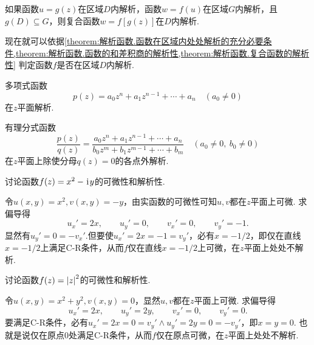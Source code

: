 \begin{theorem}\label{theorem:解析函数.复合函数的解析性}
如果函数\(u=g(z)\)在区域\(D\)内解析，函数\(w=f(u)\)在区域\(G\)内解析，且\(g(D) \subseteq G\)，则复合函数\(w=f[g(z)]\)在\(D\)内解析.
\end{theorem}

现在就可以依据\cref{theorem:解析函数.函数在区域内处处解析的充分必要条件,theorem:解析函数.函数的和差积商的解析性,theorem:解析函数.复合函数的解析性} 判定函数\(f\)是否在区域\(D\)内解析.

\begin{example}
多项式函数\begin{equation*}
p(z) = a_0 z^n + a_1 z^{n-1} + \dotsb + a_n \quad (a_0 \neq 0)
\end{equation*}在\(z\)平面解析.
\end{example}

\begin{example}
有理分式函数\begin{equation*}
\frac{p(z)}{q(z)} = \frac{a_0 z^n + a_1 z^{n-1} + \dotsb + a_n}{b_0 z^m + b_1 z^{m-1} + \dotsb + b_m} \quad (a_0 \neq 0,\ b_0 \neq 0)
\end{equation*}在\(z\)平面上除使分母\(q(z)=0\)的各点外解析.
\end{example}

\begin{example}
讨论函数\(f(z) = x^2 - \kern1pt\mathrm{i}\kern1pt y\)的可微性和解析性.
\begin{solution}
令\(u(x,y) = x^2, v(x,y) = -y\)，由实函数的可微性可知\(u,v\)都在\(z\)平面上可微.
求偏导得\begin{equation*}
u_x' = 2x, \qquad u_y' = 0, \qquad v_x' = 0, \qquad v_y' = -1.
\end{equation*}显然有\(u_y' = 0 = -v_x'\).但要使\(u_x' = 2x = -1 = v_y'\)，必有\(x = -1/2\)，即仅在直线\(x=-1/2\)上满足C-R条件，从而\(f\)仅在直线\(x=-1/2\)上可微，在\(z\)平面上处处不解析.
\end{solution}
\end{example}

\begin{example}
讨论函数\(f(z) = \abs{z}^2\)的可微性和解析性.
\begin{solution}
令\(u(x,y) = x^2 + y^2, v(x,y) = 0\)，显然\(u,v\)都在\(z\)平面上可微.
求偏导得\begin{equation*}
u_x' = 2x, \qquad u_y' = 2y, \qquad v_x' = 0, \qquad v_y' = 0.
\end{equation*}要满足C-R条件，必有\(u_x' = 2x = 0 = v_y' \land u_y' = 2y = 0 = -v_y'\)，即\(x=y=0\).
也就是说仅在原点0处满足C-R条件，从而\(f\)仅在原点可微，在\(z\)平面上处处不解析.
\end{solution}
\end{example}

